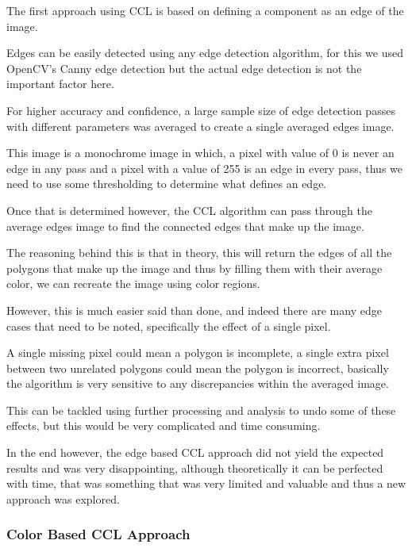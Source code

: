 \documentclass[12pt]{article}
\newcommand{\sentence}{} %
\begin{document}
    \tab
    The first approach using CCL is based on defining a component as an edge of the image.
    \sentence
    Edges can be easily detected using any edge detection algorithm, for this we used OpenCV's Canny edge detection
    but the actual edge detection is not the important factor here.
    \sentence
    For higher accuracy and confidence, a large sample size of edge detection passes with different parameters was
    averaged to create a single averaged edges image.
    \sentence
    This image is a monochrome image in which, a pixel with value of 0 is never an edge in any pass and a pixel with
    a value of 255 is an edge in every pass, thus we need to use some thresholding to determine what defines an edge.
    \sentence
    Once that is determined however, the CCL algorithm can pass through the average edges image to find the connected
    edges that make up the image.
    \sentence
    The reasoning behind this is that in theory, this will return the edges of all the polygons that make up the
    image and thus by filling them with their average color, we can recreate the image using color regions.
    \sentence
    However, this is much easier said than done, and indeed there are many edge cases that need to be noted,
    specifically the effect of a single pixel.
    \sentence
    A single missing pixel could mean a polygon is incomplete, a single extra pixel between two unrelated polygons
    could mean the polygon is incorrect, basically the algorithm is very sensitive to any discrepancies within the
    averaged image.
    \sentence
    This can be tackled using further processing and analysis to undo some of these effects, but this would be very
    complicated and time consuming.
    \sentence
    In the end however, the edge based CCL approach did not yield the expected results and was very disappointing,
    although theoretically it can be perfected with time, that was something that was very limited and valuable and
    thus a new approach was explored.

    \subsubsection{Color Based CCL Approach}\label{subsubsec:color-based-ccl-approach}
\end{document}
